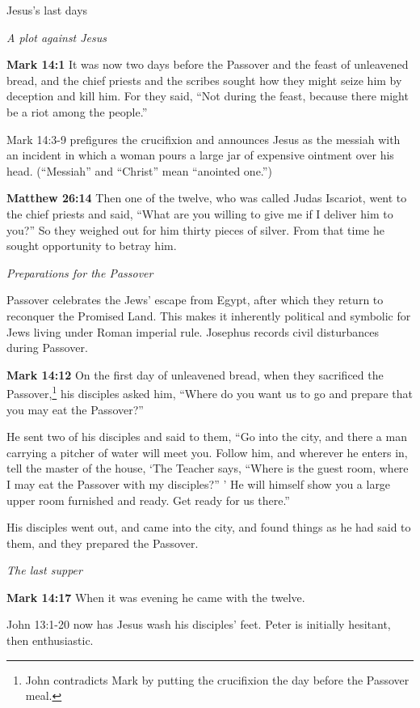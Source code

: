 \documentclass[10pt,twoside]{article} %
\newcommand{\quotesize}{\normalsize{}}
\newcommand{\comm}[1]{\begingroup \color{black!50} #1\endgroup}
\newenvironment{quotetext}{\begingroup\quotesize}{\endgroup}
\newcommand{\bible}[2]{\begin{quotetext}\textbf{#1} #2\end{quotetext}}
\newcommand{\matthew}[2]{\bible{Matthew #1}{#2}}
\newcommand{\gospelmark}[2]{\bible{Mark #1}{#2}}
\newcommand{\subhead}[1]{\emph{#1}\par}
\begin{document}
\begin{section}{Jesus's last days}

\subhead{A plot against Jesus}

\gospelmark{14:1}{
It was now two days before the Passover and the feast of unleavened bread, and the chief priests and the scribes sought how they might seize him by deception and kill him.   For they said, ``Not during the feast, because there might be a riot among the people.''}

\comm{Mark 14:3-9 prefigures the crucifixion and announces Jesus as the messiah with an incident in which a woman pours a large jar of
expensive ointment over his head. (``Messiah'' and ``Christ'' mean ``anointed one.'')}

\matthew{26:14}{
Then one of the twelve, who was called Judas Iscariot, went to the chief priests   and said, ``What are you willing to give me if I deliver him to you?'' So they weighed out for him thirty pieces of silver.   From that time he sought opportunity to betray him.
}

\subhead{Preparations for the Passover}

\comm{Passover celebrates the Jews' escape from Egypt, after which they return to reconquer the Promised Land. This makes it
inherently political and symbolic for Jews living under Roman imperial rule. Josephus records civil disturbances during Passover.}

\gospelmark{14:12}{
  On the first day of unleavened bread, when they sacrificed the Passover,\footnote{John contradicts Mark by putting the crucifixion the day before
the Passover meal.}
his disciples asked him, ``Where do you want us to go and prepare that you may eat the Passover?''

  He sent two of his disciples and said to them, ``Go into the city, and there a man carrying a pitcher of water will meet you. Follow him,    and wherever he enters in, tell the master of the house, `The Teacher says, ``Where is the guest room, where I may eat the Passover with my disciples?'' '    He will himself show you a large upper room furnished and ready. Get ready for us there.''

  His disciples went out, and came into the city, and found things as he had said to them, and they prepared the Passover. 
}

\subhead{The last supper}

\gospelmark{14:17}{
When it was evening he came with the twelve.}

\comm{John 13:1-20 now has Jesus wash his disciples' feet. Peter is initially hesitant, then enthusiastic.}


\end{section}
\end{document}
